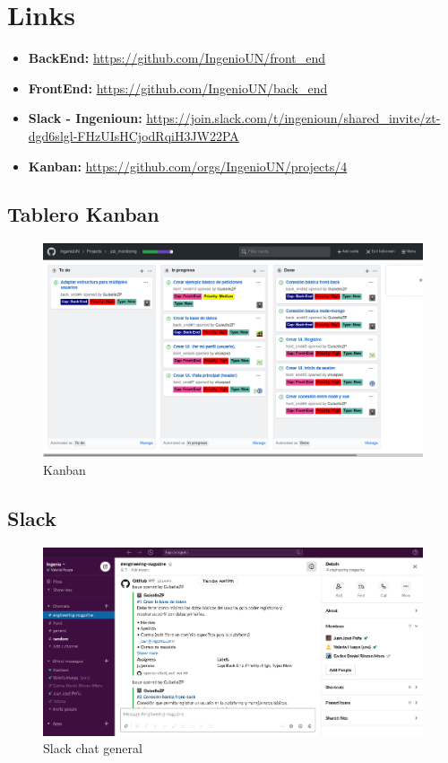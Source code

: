 \documentclass[a4paper,12 pt]{article}
\begin{document}
\section{Links}

\begin{itemize}
    \item \textbf{BackEnd:} \url{https://github.com/IngenioUN/front_end}
    \item \textbf{FrontEnd:} \url{https://github.com/IngenioUN/back_end}
    \item \textbf{Slack - Ingenioun:}
    \url{https://join.slack.com/t/ingenioun/shared_invite/zt-dgd6slgl-FHzUIsHCjodRqiH3JW22PA}
    \item \textbf{Kanban:} \url{https://github.com/orgs/IngenioUN/projects/4}
\end{itemize}

\subsection*{Tablero Kanban}

\begin{figure}[H]
    \centering
    \includegraphics[scale = 0.3]{images/kanban.png}
    \caption{Kanban}
    \label{kanban}
\end{figure}{}

\subsection*{Slack} 
\begin{figure}[H]
    \centering
    \includegraphics[scale = 0.4]{images/captura.png}
    \caption{Slack chat general}
    \label{slack00}
\end{figure}{}
\end{document}

